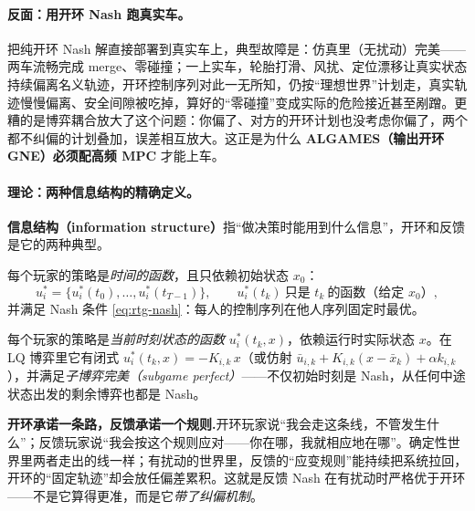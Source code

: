 \paragraph{反面：用开环 Nash 跑真实车。}
把纯开环 Nash 解直接部署到真实车上，典型故障是：仿真里（无扰动）完美——两车流畅完成 merge、零碰撞；一上实车，轮胎打滑、风扰、定位漂移让真实状态持续偏离名义轨迹，开环控制序列对此一无所知，仍按“理想世界”计划走，真实轨迹慢慢偏离、安全间隙被吃掉，算好的“零碰撞”变成实际的危险接近甚至剐蹭。更糟的是博弈耦合放大了这个问题：你偏了、对方的开环计划也没考虑你偏了，两个都不纠偏的计划叠加，误差相互放大。这正是为什么 \textbf{ALGAMES（输出开环 GNE）必须配高频 MPC} 才能上车。

\paragraph{理论：两种信息结构的精确定义。}
\textbf{信息结构（information structure）}指“做决策时能用到什么信息”，开环和反馈是它的两种典型\cite{basar1999dynamic}。

\begin{definition}\label{def:rtg-olne}
每个玩家的策略是\emph{时间的函数}，且只依赖初始状态 $x_0$：
\[
  u_i^*=\big\{u_i^*(t_0),\dots,u_i^*(t_{T-1})\big\},\qquad u_i^*(t_k)\ \text{只是 }t_k\ \text{的函数（给定 }x_0\text{）},
\]
并满足 Nash 条件 \cref{eq:rtg-nash}：每人的控制序列在他人序列固定时最优。
\end{definition}

\begin{definition}\label{def:rtg-fbne}
每个玩家的策略是\emph{当前时刻状态的函数} $u_i^*(t_k,x)$，依赖运行时实际状态 $x$。在 LQ 博弈里它有闭式 $u_i^*(t_k,x)=-K_{i,k}\,x$（或仿射 $\bar u_{i,k}+K_{i,k}(x-\bar x_k)+\alpha k_{i,k}$），并满足\emph{子博弈完美（subgame perfect）}——不仅初始时刻是 Nash，从任何中途状态出发的剩余博弈也都是 Nash。
\end{definition}

\begin{insight}
\textbf{开环承诺一条路，反馈承诺一个规则.}\;开环玩家说“我会走这条线，不管发生什么”；反馈玩家说“我会按这个规则应对——你在哪，我就相应地在哪”。确定性世界里两者走出的线一样；有扰动的世界里，反馈的“应变规则”能持续把系统拉回，开环的“固定轨迹”却会放任偏差累积。这就是反馈 Nash 在有扰动时严格优于开环——不是它算得更准，而是它\emph{带了纠偏机制}。
\end{insight}

